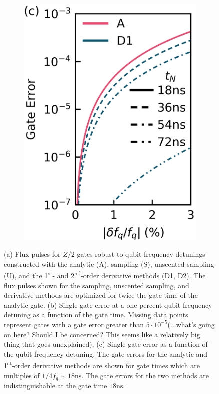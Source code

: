 \begin{figure}[ht]
\begin{subfigure}{.4\textwidth}
    \caption{\label{fig:staticb}}
  \end{subfigure}\hfill
  \begin{subfigure}{.23\textwidth}
    \includegraphics[width=\linewidth]{assets/f2c.png}
    \caption{\label{fig:staticc}}
  \end{subfigure}
  \caption{
    (a) Flux pulses for $Z/2$ gates robust to qubit frequency detunings constructed with the
    analytic (A), sampling (S), unscented sampling (U), and the 1\textsuperscript{st}-
    and 2\textsuperscript{nd}-order derivative methods (D1, D2). The flux pulses shown
    for the sampling, unscented sampling, and derivative methods are optimized
    for twice the gate time of the analytic gate.
    (b) Single gate error at a one-percent qubit frequency detuning as
    a function of the gate time. Missing
    data points represent gates with a gate error greater than $5 \cdot 10^{-5}$(...what's going on here? Should I be concerned? This seems like a relatively big thing that goes unexplained).
    (c) Single gate error as a function of the qubit frequency detuning.
    The gate errors for the analytic and 1\textsuperscript{st}-order derivative
    methods are shown for gate times which are multiples of $1 / 4 f_{q} \sim 18 \textrm{ns}$.
    The gate errors for the two methods are
    indistinguishable at the gate time $18 \textrm{ns}$.
  }
  \label{fig:static}
\end{figure}

